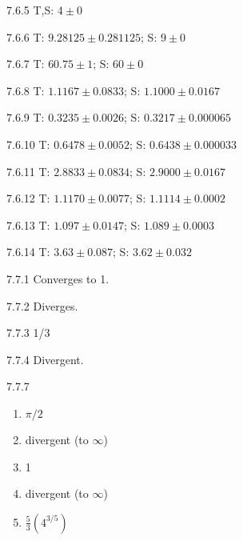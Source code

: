 \begin{Answer}{7.6.5}
 T,S: $4\pm0$
\end{Answer}
\begin{Answer}{7.6.6}
 T: $9.28125\pm0.281125 $; S: $9\pm0$
\end{Answer}
\begin{Answer}{7.6.7}
 T: $60.75\pm1$; S: $60\pm0$
\end{Answer}
\begin{Answer}{7.6.8}
 T: $1.1167\pm 0.0833$; S: $1.1000\pm 0.0167$
\end{Answer}
\begin{Answer}{7.6.9}
 T: $0.3235\pm 0.0026$; S: $0.3217\pm 0.000065$
\end{Answer}
\begin{Answer}{7.6.10}
 T: $0.6478\pm 0.0052$; S: $0.6438\pm 0.000033$
\end{Answer}
\begin{Answer}{7.6.11}
 T: $2.8833\pm 0.0834$; S: $2.9000\pm 0.0167$
\end{Answer}
\begin{Answer}{7.6.12}
 T: $1.1170\pm 0.0077$; S: $1.1114\pm 0.0002$
\end{Answer}
\begin{Answer}{7.6.13}
 T: $1.097\pm 0.0147$; S: $1.089\pm 0.0003$
\end{Answer}
\begin{Answer}{7.6.14}
 T: $3.63\pm 0.087$; S: $3.62\pm 0.032$
\end{Answer}
\begin{Answer}{7.7.1}
		Converges to 1.
	
\end{Answer}
\begin{Answer}{7.7.2}
		Diverges.
	
\end{Answer}
\begin{Answer}{7.7.3}
		1/3
	
\end{Answer}
\begin{Answer}{7.7.4}
		Divergent.
	
\end{Answer}
\begin{Answer}{7.7.7}
		\begin{enumerate}
			\item	$\pi/2$
			\item	divergent (to $\infty$)
			\item	1
			\item	divergent (to $\infty$)
			\item	$\frac{5}{3}(4^{3/5})$
		\end{enumerate}
	
\end{Answer}
